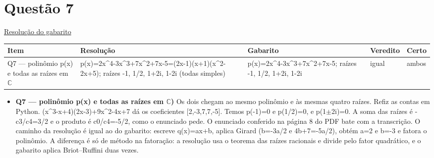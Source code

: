 \documentclass{article}%
\begin{document}
\section*{Questão 7}%
\href{https://poliedroresolve.sistemapoliedro.com.br/vestibulares/ita/2026/ita-2-fase-dia-1-28-10-2025-2-fase-dia-1/dissertativa-7-matematica-2-fase-dia-1-ita-2026}{Resolução do gabarito}\par\smallskip%
\begin{longtable}{@{}p{} p{} p{} p{} p{}@{}}\toprule Item & Resolução & Gabarito & Veredito & Certo \\ \midrule
Q7 --- polinômio p(x) e todas as raízes em $\mathbb{C}$ & p(x)=2x\^{}4{-}3x\^{}3+7x\^{}2+7x{-}5=(2x{-}1)(x+1)(x\^{}2{-}2x+5); raízes {-}1, 1/2, 1+2i, 1{-}2i (todas simples) & p(x)=2x\^{}4{-}3x\^{}3+7x\^{}2+7x{-}5; raízes {-}1, 1/2, 1+2i, 1{-}2i & igual & ambos \\
\bottomrule\end{longtable}%
\begin{itemize}%
\item%
\textbf{Q7 --- polinômio p(x) e todas as raízes em $\mathbb{C}$)} Os dois chegam ao mesmo polinômio e às mesmas quatro raízes. Refiz as contas em Python. (x\^{}3{-}x+4)(2x{-}3)+9x\^{}2{-}4x+7 dá os coeficientes {[}2,{-}3,7,7,{-}5{]}. Temos p({-}1)=0 e p(1/2)=0, e p(1$\pm$2i)=0. A soma das raízes é {-}c3/c4=3/2 e o produto é c0/c4={-}5/2, como o enunciado pede. O enunciado conferido na página 8 do PDF bate com a transcrição. O caminho da resolução é igual ao do gabarito: escreve q(x)=ax+b, aplica Girard (b={-}3a/2 e 4b+7={-}5a/2), obtém a=2 e b={-}3 e fatora o polinômio. A diferença é só de método na fatoração: a resolução usa o teorema das raízes racionais e divide pelo fator quadrático, e o gabarito aplica Briot--Ruffini duas vezes.%
\end{itemize}%
\end{document}

